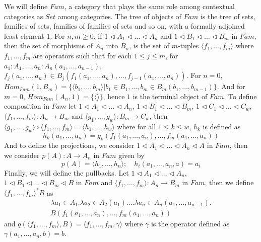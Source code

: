 We will define $Fam$, a category that plays the same role
among contextual categories as $Set$ among categories. 
The tree of objects of $Fam$ is the tree of sets, families 
of sets, families of families of sets and so on, with a formally
adjoined least element $1$.
For $n, m \geq 0$, 
if $1 \vartriangleleft A_1 \vartriangleleft \dots \vartriangleleft A_n$
and $1 \vartriangleleft B_1 \vartriangleleft \dots \vartriangleleft B_m$
in $Fam$, then the set of morphisms of $A_n$ into $B_n$,
is the set of $m$-tuples $\langle f_1, \dots, f_m \rangle$
where $f_1, \dots, f_m$ are operators such that for each $1 \leq j \leq m$,
for $a_1 : A_1, \dots, a_n : A_n(a_1, \dots, a_{n-1})$,
$f_j(a_1, \dots, a_n) \in B_j(f_1(a_1, \dots, a_n), \dots, f_{j-1}(a_1, \dots, a_n))$.
For $n = 0$, $Hom_{Fam}(1, B_m) = \{ 
    \langle b_1, \dots, b_m \rangle | b_1 \in B_1, \dots, b_m \in B_m(b_1, \dots, b_{m-1})
\}$. And for $m = 0$, $Hom_{Fam}(A_n, 1) = \{ \langle \rangle \}$,
hence $1$ is the terminal object of $Fam$.
To define composition in $Fam$ let 
$1 \vartriangleleft A_1 \vartriangleleft \dots \vartriangleleft A_n$,
$1 \vartriangleleft B_1 \vartriangleleft \dots \vartriangleleft B_m$,
$1 \vartriangleleft C_1 \vartriangleleft \dots \vartriangleleft C_w$,
$\langle f_1, \dots, f_m \rangle : A_n \to B_m$ and 
$\langle g_1, \dots, g_w \rangle : B_m \to C_w$, then 
$\langle g_1, \dots, g_w \rangle 
\circ \langle f_1, \dots, f_m \rangle 
= \langle h_1, \dots, h_w \rangle$ where for all
$1 \leq k \leq w$, $h_k$ is defined as
\begin{equation*}
    h_k(a_1, \dots, a_n) = g_k(f_1(a_1, \dots, a_n), \dots, f_m(a_1, \dots, a_n))
\end{equation*}
And to define the projections, we consider
$1 \vartriangleleft A_1 \vartriangleleft \dots \vartriangleleft A_n \vartriangleleft A$
in $Fam$, then we consider $p(A) : A \to A_n$ in $Fam$ given by
\begin{equation*}
    p(A) = \langle h_1, \dots, h_n \rangle; \quad h_i(a_1, \dots, a_n, a) = a_i
\end{equation*}
Finally, we will define the pullbacks. Let 
$1 \vartriangleleft A_1 \vartriangleleft \dots \vartriangleleft A_n$,
$1 \vartriangleleft B_1 \vartriangleleft \dots \vartriangleleft B_m \vartriangleleft B$
in $Fam$ and $\langle f_1, \dots, f_m \rangle : A_n \to B_m$ in $Fam$,
then we define $\langle f_1, \dots, f_m \rangle^*B$ as
\begin{multline*}
    \lambda a_1 \in A_1. \lambda a_2 \in A_2(a_1).
    \dots \lambda a_n \in A_n(a_1, \dots, a_{n-1}). \\ 
    B(f_1(a_1, \dots, a_n), \dots, f_m(a_1, \dots, a_n))
\end{multline*}
and $q(\langle f_1, \dots, f_m \rangle, B) = \langle f_1, \dots, f_m, \gamma \rangle$
where $\gamma$ is the operator defined as \\ 
$\gamma(a_1, \dots, a_n, b) = b$.

